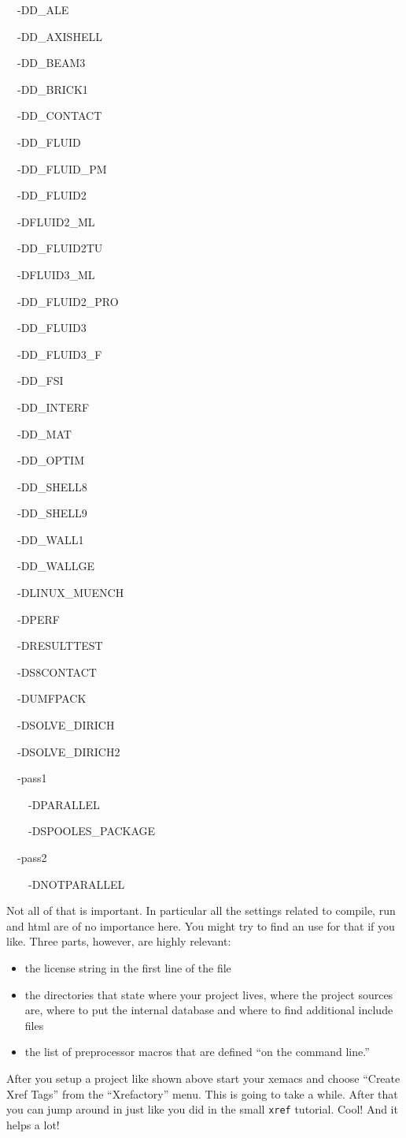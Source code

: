 \begin{lyxcode}
~~-DD\_ALE

~~-DD\_AXISHELL

~~-DD\_BEAM3

~~-DD\_BRICK1

~~-DD\_CONTACT

~~-DD\_FLUID

~~-DD\_FLUID\_PM

~~-DD\_FLUID2

~~-DFLUID2\_ML

~~-DD\_FLUID2TU

~~-DFLUID3\_ML

~~-DD\_FLUID2\_PRO

~~-DD\_FLUID3

~~-DD\_FLUID3\_F

~~-DD\_FSI

~~-DD\_INTERF

~~-DD\_MAT

~~-DD\_OPTIM

~~-DD\_SHELL8

~~-DD\_SHELL9

~~-DD\_WALL1

~~-DD\_WALLGE

~~-DLINUX\_MUENCH

~~-DPERF

~~-DRESULTTEST

~~-DS8CONTACT

~~-DUMFPACK

~~-DSOLVE\_DIRICH

~~-DSOLVE\_DIRICH2

~~-pass1

~~~~-DPARALLEL

~~~~-DSPOOLES\_PACKAGE

~~-pass2

~~~~-DNOTPARALLEL~
\end{lyxcode}
Not all of that is important. In particular all the settings related
to compile, run and html are of no importance here. You might try
to find an use for that if you like. Three parts, however, are highly
relevant:

\begin{itemize}
\item the license string in the first line of the file
\item the directories that state where your project lives, where the project
sources are, where to put the internal database and where to find
additional include files
\item the list of preprocessor macros that are defined {}``on the command
line.''
\end{itemize}
After you setup a project like shown above start your xemacs and choose
{}``Create Xref Tags'' from the {}``Xrefactory'' menu. This is
going to take a while. After that you can jump around in \ccarat{}
just like you did in the small \texttt{xref} tutorial. Cool! And it
helps a lot!


